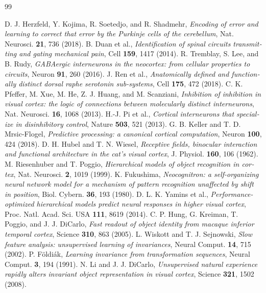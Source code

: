 \begin{thebibliography}{99}
\begin{otherlanguage}{english}
 D. J. Herzfeld, Y. Kojima, R. Soetedjo, and R. Shadmehr, \emph{Encoding of error and learning to correct that error by the Purkinje cells of the cerebellum}, Nat. Neurosci. \textbf{21}, 736 (2018).
 B. Duan et al., \emph{Identification of spinal circuits transmitting and gating mechanical pain}, Cell \textbf{159}, 1417 (2014).
 R. Tremblay, S. Lee, and B. Rudy, \emph{GABAergic interneurons in the neocortex: from cellular properties to circuits}, Neuron \textbf{91}, 260 (2016).
 J. Ren et al., \emph{Anatomically defined and functionally distinct dorsal raphe serotonin sub-systems}, Cell \textbf{175}, 472 (2018).
 C. K. Pfeffer, M. Xue, M. He, Z. J. Huang, and M. Scanziani, \emph{Inhibition of inhibition in visual cortex: the logic of connections between molecularly distinct interneurons}, Nat. Neurosci. \textbf{16}, 1068 (2013).
 H.-J. Pi et al., \emph{Cortical interneurons that specialize in disinhibitory control}, Nature \textbf{503}, 521 (2013).
 G. B. Keller and T. D. Mrsic-Flogel, \emph{Predictive processing: a canonical cortical computation}, Neuron \textbf{100}, 424 (2018).
 D. H. Hubel and T. N. Wiesel, \emph{Receptive fields, binocular interaction and functional architecture in the cat's visual cortex}, J. Physiol. \textbf{160}, 106 (1962).
 M. Riesenhuber and T. Poggio, \emph{Hierarchical models of object recognition in cortex}, Nat. Neurosci. \textbf{2}, 1019 (1999).
 K. Fukushima, \emph{Neocognitron: a self-organizing neural network model for a mechanism of pattern recognition unaffected by shift in position}, Biol. Cybern. \textbf{36}, 193 (1980).
 D. L. K. Yamins et al., \emph{Performance-optimized hierarchical models predict neural responses in higher visual cortex}, Proc. Natl. Acad. Sci. USA \textbf{111}, 8619 (2014).
 C. P. Hung, G. Kreiman, T. Poggio, and J. J. DiCarlo, \emph{Fast readout of object identity from macaque inferior temporal cortex}, Science \textbf{310}, 863 (2005).
 L. Wiskott and T. J. Sejnowski, \emph{Slow feature analysis: unsupervised learning of invariances}, Neural Comput. \textbf{14}, 715 (2002).
 P. F\"oldi\'ak, \emph{Learning invariance from transformation sequences}, Neural Comput. \textbf{3}, 194 (1991).
 N. Li and J. J. DiCarlo, \emph{Unsupervised natural experience rapidly alters invariant object representation in visual cortex}, Science \textbf{321}, 1502 (2008).

\end{otherlanguage}
\end{thebibliography}
